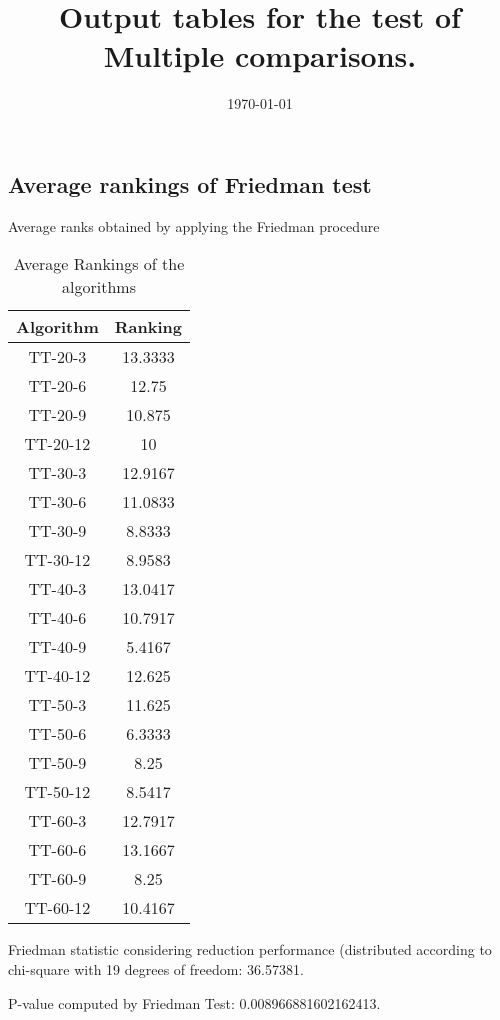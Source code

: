 \documentclass[a4paper,10pt]{article}
\title{Output tables for the test of Multiple comparisons.}
\author{}
\date{\today}
\begin{document}
\begin{landscape}
\pagestyle{empty}
\maketitle
\thispagestyle{empty}
\section{Average rankings of Friedman test}



Average ranks obtained by applying the Friedman procedure

\begin{table}[!htp]
\centering
\begin{tabular}{|c|c|}\hline
Algorithm&Ranking\\\hline
TT-20-3 & 13.3333\\
TT-20-6 & 12.75\\
TT-20-9 & 10.875\\
TT-20-12 & 10\\
TT-30-3 & 12.9167\\
TT-30-6 & 11.0833\\
TT-30-9 & 8.8333\\
TT-30-12 & 8.9583\\
TT-40-3 & 13.0417\\
TT-40-6 & 10.7917\\
TT-40-9 & 5.4167\\
TT-40-12 & 12.625\\
TT-50-3 & 11.625\\
TT-50-6 & 6.3333\\
TT-50-9 & 8.25\\
TT-50-12 & 8.5417\\
TT-60-3 & 12.7917\\
TT-60-6 & 13.1667\\
TT-60-9 & 8.25\\
TT-60-12 & 10.4167\\
\hline
\end{tabular}
\caption{Average Rankings of the algorithms}
\end{table}

Friedman statistic considering reduction performance (distributed according to chi-square with 19 degrees of freedom: 36.57381.

P-value computed by Friedman Test: 0.008966881602162413.\newline




\end{landscape}
\end{document}
